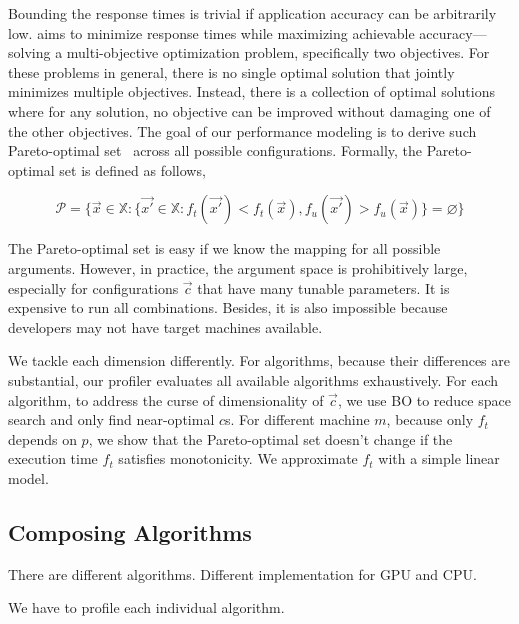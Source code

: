 Bounding the response times is trivial if application accuracy can be
arbitrarily low. \sysname{} aims to minimize response times while maximizing
achievable accuracy---solving a multi-objective optimization problem,
specifically two objectives. For these problems in general, there is no single
optimal solution that jointly minimizes multiple objectives. Instead, there is a
collection of optimal solutions where for any solution, no objective can be
improved without damaging one of the other objectives. The goal of our
performance modeling is to derive such Pareto-optimal
set~\cite{collette2013multiobjective} across all possible
configurations. Formally, the Pareto-optimal set is defined as follows,

{\small \vspace{-1.2em}
  \begin{equation}
    \mathcal{P} = \{ \vec{x} \in \mathbb{X} : \{ \vec{x'} \in \mathbb{X}:
    f_t(\vec{x'}) < f_t(\vec{x}), f_u(\vec{x'}) > f_u(\vec{x}) \} = \varnothing\}
  \label{eq:pareto}
\end{equation}
\vspace{-1.2em}
}

 The Pareto-optimal set is easy if we know the mapping for all
possible arguments. However, in practice, the argument space is prohibitively
large, especially for configurations $\vec{c}$ that have many tunable
parameters. It is expensive to run all combinations. Besides, it is also
impossible because developers may not have target machines available.

 We tackle each dimension differently. For algorithms,
because their differences are substantial, our profiler evaluates all available
algorithms exhaustively. For each algorithm, to address the curse of
dimensionality of $\vec{c}$, we use BO to reduce space search and only find
near-optimal $c$s. For different machine $m$, because only $f_t$ depends on $p$,
we show that the Pareto-optimal set doesn't change if the execution time $f_t$
satisfies monotonicity. We approximate $f_t$ with a simple linear model.

\subsection{Composing Algorithms}
\label{sec:compose-models}

There are different algorithms. Different implementation for GPU and CPU.

We have to profile each individual algorithm.


